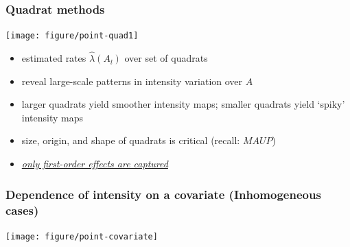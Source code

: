 \documentclass[10pt]{beamer}\usepackage[]{graphicx}\usepackage[]{color}
\newenvironment{knitrout}{}{} %
\newcommand{\bitemize}{\begin{itemize}}
\newcommand{\eitemize}{\end{itemize}}
\begin{document}
\begin{frame}
\frametitle{Quadrat methods}
\begin{knitrout}
\color{fgcolor}

{\centering \texttt{[image: figure/point-quad1]} 

}



\end{knitrout}

\vspace{-1.5cm}
\bitemize
\item estimated rates $\hat{\lambda}(A_l)$ over set of quadrats 
\item reveal large-scale patterns in intensity variation over $A$ 
\item larger quadrats yield smoother intensity maps; smaller quadrats yield `spiky' intensity maps
\item size, origin, and shape of quadrats is critical (recall: {\it $MAUP$})
\item \underline{\it only first-order effects are captured}
\eitemize
\end{frame}

\begin{frame}
\frametitle{Dependence of intensity on a covariate (Inhomogeneous cases)}
\begin{knitrout}
\color{fgcolor}

{\centering \texttt{[image: figure/point-covariate]} 

}



\end{knitrout}


\end{frame}
\end{document}
